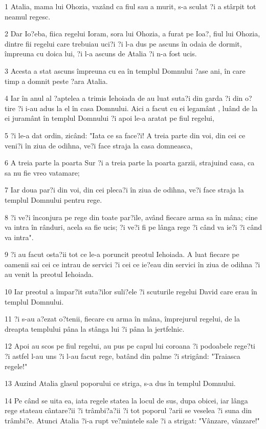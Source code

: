 \par 1 Atalia, mama lui Ohozia, vazând ca fiul sau a murit, s-a sculat ?i a stârpit tot neamul regesc.
\par 2 Dar Io?eba, fiica regelui Ioram, sora lui Ohozia, a furat pe Ioa?, fiul lui Ohozia, dintre fii regelui care trebuiau uci?i ?i l-a dus pe ascuns în odaia de dormit, împreuna cu doica lui, ?i l-a ascuns de Atalia ?i n-a fost ucis.
\par 3 Acesta a stat ascuns împreuna cu ea în templul Domnului ?ase ani, în care timp a domnit peste ?ara Atalia.
\par 4 Iar în anul al ?aptelea a trimis Iehoiada de au luat suta?i din garda ?i din o?tire ?i i-au adus la el în casa Domnului. Aici a facut cu ei legamânt , luând de la ei juramânt în templul Domnului ?i apoi le-a aratat pe fiul regelui,
\par 5 ?i le-a dat ordin, zicând: "Iata ce sa face?i! A treia parte din voi, din cei ce veni?i în ziua de odihna, ve?i face straja la casa domneasca,
\par 6 A treia parte la poarta Sur ?i a treia parte la poarta garzii, strajuind casa, ca sa nu fie vreo vatamare;
\par 7 Iar doua par?i din voi, din cei pleca?i în ziua de odihna, ve?i face straja la templul Domnului pentru rege.
\par 8 ?i ve?i înconjura pe rege din toate par?ile, având fiecare arma sa în mâna; cine va intra în rânduri, acela sa fie ucis; ?i ve?i fi pe lânga rege ?i când va ie?i ?i când va intra".
\par 9 ?i au facut osta?ii tot ce le-a poruncit preotul Iehoiada. A luat fiecare pe oamenii sai cei ce intrau de servici ?i cei ce ie?eau din servici în ziua de odihna ?i au venit la preotul Iehoiada.
\par 10 Iar preotul a împar?it suta?ilor suli?ele ?i scuturile regelui David care erau în templul Domnului.
\par 11 ?i s-au a?ezat o?tenii, fiecare cu arma în mâna, împrejurul regelui, de la dreapta templului pâna la stânga lui ?i pâna la jertfelnic.
\par 12 Apoi au scos pe fiul regelui, au pus pe capul lui coroana ?i podoabele rege?ti  ?i astfel l-au uns ?i l-au facut rege, batând din palme ?i strigând: "Traiasca regele!"
\par 13 Auzind Atalia glasul poporului ce striga, s-a dus în templul Domnului.
\par 14 Pe când se uita ea, iata regele statea la locul de sus, dupa obicei, iar lânga rege stateau cântare?ii ?i trâmbi?a?ii ?i tot poporul ?arii se veselea ?i suna din trâmbi?e. Atunci Atalia ?i-a rupt ve?mintele sale ?i a strigat: "Vânzare, vânzare!"
